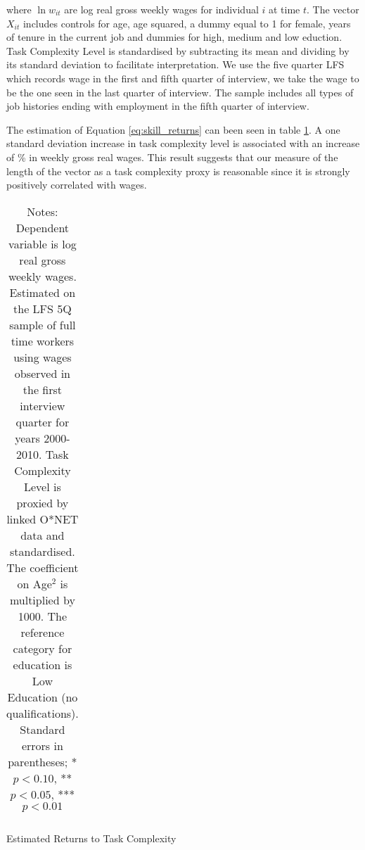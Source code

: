\documentclass[12pt,authoryear]{elsarticle}
\begin{document}
	where $\ln w_{it}$ are log real gross weekly wages for individual $i$ at time $t$. The vector $X_{it}$ includes controls for age, age squared, a dummy equal to 1 for female, years of tenure in the current job and dummies for high, medium and low eduction. Task Complexity Level is standardised by subtracting its mean and dividing by its standard deviation to facilitate interpretation. We use the five quarter LFS which records wage in the first and fifth quarter of interview, we take the wage to be the one seen in the last quarter of interview. The sample includes all types of job histories ending with employment in the fifth quarter of interview.
	
	\vspace{2mm}
	
	The estimation of Equation \ref{eq:skill_returns} can been seen in table \ref{skill_returns}. A one standard deviation increase in task complexity level is associated with an increase of \hspace{-1mm}\% in weekly gross real wages. This result suggests that our measure of the length of the vector as a task complexity proxy is reasonable since it is strongly positively correlated with wages. 
	
	
	\begin{table}[t]
		\centering
		\begin{tabular}{l*{1}{c}}
			
		\end{tabular}
		\caption{Estimated Returns to Task Complexity} 
		\caption*{\footnotesize Notes: Dependent variable is log real gross weekly wages. Estimated on the LFS 5Q sample of full time workers using wages observed in the first interview quarter for years 2000-2010. Task Complexity Level is proxied by linked O*NET data and standardised. The coefficient on Age$^2$ is multiplied by 1000. The reference category for education is Low Education (no qualifications). Standard errors in parentheses;	* \(p<0.10\), ** \(p<0.05\), *** \(p<0.01\)}
		\label{skill_returns}
	\end{table}
	
	

	
	
\end{document}
